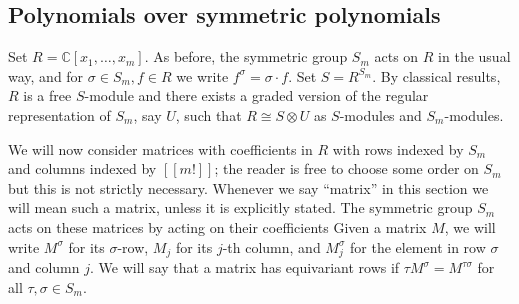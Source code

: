 \documentclass[11pt,fleqn]{article}
\newcommand\CC{\mathbb C}
\newcommand\ot{\otimes}
\begin{document}
\subsection{Polynomials over symmetric polynomials}
Set $R = \CC[x_1, \ldots, x_m]$. As before, the symmetric group $S_m$ acts on 
$R$ in the usual way, and for $\sigma \in S_m, f \in R$ we write $f^\sigma = 
\sigma \cdot f$. Set $S = R^{S_m}$. By classical results, $R$
is a free $S$-module and there exists a graded version of the regular 
representation of $S_m$, say $U$, such that $R \cong S \ot U$ as $S$-modules 
and $S_m$-modules. 

We will now consider matrices with coefficients in $R$ with rows indexed by 
$S_m$ and columns indexed by $[[m!]]$; the reader is free to choose some order 
on $S_m$ but this is not strictly necessary. Whenever we say ``matrix'' in 
this section we will mean such a matrix, unless it is explicitly stated. The 
symmetric group $S_m$ acts on these matrices by acting on their coefficients 
Given a matrix $M$, we will write $M^\sigma$ for its $\sigma$-row, $M_j$ for 
its $j$-th column, and $M^\sigma_j$ for the element in row $\sigma$ and column 
$j$. We will say that a matrix has equivariant rows if $\tau M^\sigma = 
M^{\tau \sigma}$ for all $\tau, \sigma \in S_m$.
\end{document}
